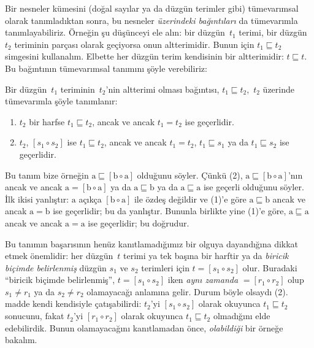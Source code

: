\documentclass[../../../include/open-logic-section]{subfiles}
\begin{document}


Bir nesneler kümesini (doğal sayılar ya da düzgün terimler gibi)
tümevarımsal olarak tanımladıktan sonra, bu nesneler \emph{üzerindeki
bağıntıları} da tümevarımla tanımlayabiliriz. Örneğin şu düşünceyi ele
alın: bir düzgün~$t_1$ terimi, bir düzgün~$t_2$ teriminin parçası olarak
geçiyorsa onun altterimidir. Bunun için $t_1 \sqsubseteq t_2$ simgesini
kullanalım. Elbette her düzgün terim kendisinin bir altterimidir: $t
\sqsubseteq t$. Bu bağıntının tümevarımsal tanımını şöyle verebiliriz:

\begin{defn}
  Bir düzgün~$t_1$ teriminin~$t_2$'nin altterimi olması bağıntısı, $t_1
  \sqsubseteq t_2$,~$t_2$ üzerinde tümevarımla şöyle tanımlanır:
  \begin{enumerate}
  \item $t_2$ bir harfse $t_1 \sqsubseteq t_2$, ancak ve ancak $t_1 = t_2$
    ise geçerlidir.
  \item $t_2$, $[s_1 \circ s_2]$ ise $t_1 \sqsubseteq t_2$, ancak ve
    ancak $t_1 = t_2$, $t_1 \sqsubseteq s_1$ ya da $t_1 \sqsubseteq s_2$
    ise geçerlidir.
  \end{enumerate}
\end{defn}

Bu tanım bize örneğin $\mathrm{a} \sqsubseteq [\mathrm{b} \circ
\mathrm{a}]$ olduğunu söyler. Çünkü (2), $\mathrm{a} \sqsubseteq
[\mathrm{b} \circ \mathrm{a}]$'nın ancak ve ancak $\mathrm{a} =
[\mathrm{b} \circ \mathrm{a}]$ ya da $\mathrm{a} \sqsubseteq
\mathrm{b}$ ya da $\mathrm{a} \sqsubseteq \mathrm{a}$ ise geçerli
olduğunu söyler. İlk ikisi yanlıştır: $\mathrm{a}$ açıkça $[\mathrm{b}
\circ \mathrm{a}]$ ile özdeş değildir ve (1)'e göre $\mathrm{a}
\sqsubseteq \mathrm{b}$ ancak ve ancak $\mathrm{a} = \mathrm{b}$ ise
geçerlidir; bu da yanlıştır. Bununla birlikte yine (1)'e göre,
$\mathrm{a} \sqsubseteq \mathrm{a}$ ancak ve ancak $\mathrm{a} =
\mathrm{a}$ ise geçerlidir; bu doğrudur.

Bu tanımın başarısının henüz kanıtlamadığımız bir olguya dayandığına
dikkat etmek önemlidir: her düzgün~$t$ terimi ya tek başına bir harftir
ya da \emph{biricik biçimde belirlenmiş} düzgün $s_1$ ve $s_2$ terimleri
için $t = [s_1 \circ s_2]$ olur. Buradaki ``biricik biçimde belirlenmiş'',
$t = [s_1 \circ s_2]$ iken \emph{aynı zamanda} $= [r_1 \circ r_2]$ olup
$s_1 \neq r_1$ ya da $s_2 \neq r_2$ olamayacağı anlamına gelir. Durum
böyle olsaydı (2). madde kendi kendisiyle
çatışabilirdi: $t_2$'yi $[s_1 \circ s_2]$ olarak okuyunca $t_1
\sqsubseteq t_2$ sonucunu, fakat $t_2$'yi $[r_1 \circ r_2]$ olarak
okuyunca $t_1 \sqsubseteq t_2$ olmadığını elde edebilirdik. Bunun
olamayacağını kanıtlamadan önce, \emph{olabildiği} bir örneğe bakalım.
\end{document}
